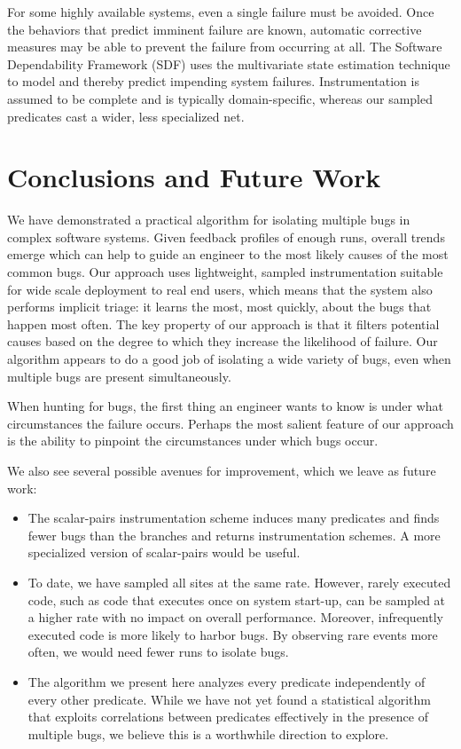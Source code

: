 \documentclass{sig-alternate}
\begin{document}
For some highly available systems, even a single failure must be
avoided.  Once the behaviors that predict imminent failure are known,
automatic corrective measures may be able to prevent the failure from
occurring at all.  The Software Dependability Framework (SDF)
\cite{Gross:2003:PSMUST} uses the multivariate state estimation
technique to model and thereby predict impending system failures.
Instrumentation is assumed to be complete and is typically
domain-specific, whereas our sampled predicates cast a wider, less
specialized net.

\section{Conclusions and Future Work}
\label{sec:conclusions}

We have demonstrated a practical algorithm for isolating multiple bugs
in complex software systems.  Given feedback profiles of enough runs,
overall trends emerge which can help to guide an engineer to the most
likely causes of the most common bugs.  Our approach uses lightweight,
sampled instrumentation suitable for wide scale deployment to real end
users, which means that the system also performs implicit triage: it
learns the most, most quickly, about the bugs that happen most often.
The key property of our approach is that it filters potential causes
based on the degree to which they increase the likelihood of failure.
Our algorithm appears to do a good job of isolating a wide variety of
bugs, even when multiple bugs are present simultaneously.

When hunting for bugs, the first thing an engineer wants to know is
under what circumstances the failure occurs.  Perhaps the most salient
feature of our approach is the ability to pinpoint the circumstances
under which bugs occur.

We also see several possible avenues for improvement, which we leave
as future work:
\begin{itemize}

\item The scalar-pairs instrumentation scheme induces many
predicates and finds fewer bugs than the branches and
returns instrumentation schemes.  A more specialized version of scalar-pairs
would be useful.

\item To date, we have sampled all sites at the same rate.  However,
rarely executed code, such as code that executes once on system start-up,
can be sampled at a higher rate with no impact on overall performance.
Moreover, infrequently executed code is more likely
to harbor bugs.  By observing rare events more often, we would need fewer
runs to isolate bugs.

\item The algorithm we present here analyzes every predicate independently
of every other predicate.  While we have not yet found a statistical algorithm that exploits
correlations between predicates effectively in the presence of
multiple bugs, we believe this is a worthwhile direction
to explore.
\end{itemize}



\end{document}
